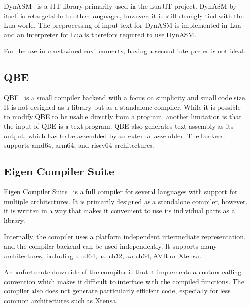 DynASM~\cite{dynasm} is a JIT library primarily used in the LuaJIT project. DynASM by itself is retargetable to other languages, however, it is still strongly tied with the Lua world. The preprocessing of input text for DynASM is implemented in Lua and an interpreter for Lua is therefore required to use DynASM.

For the use in constrained environments, having a second interpreter is not ideal.


\subsection{QBE}

QBE~\cite{qbe} is a small compiler backend with a focus on simplicity and small code size. It is not designed as a library but as a standalone compiler. While it is possible to modify QBE to be usable directly from a program, another limitation is that the input of QBE is a text program. QBE also generates text assembly as its output, which has to be assembled by an external assembler. The backend supports amd64, arm64, and riscv64 architectures.


\subsection{Eigen Compiler Suite}

Eigen Compiler Suite~\cite{ecs} is a full compiler for several languages with support for multiple architectures. It is primarily designed as a standalone compiler, however, it is written in a way that makes it convenient to use its individual parts as a library.

Internally, the compiler uses a platform independent intermediate representation, and the compiler backend can be used independently. It supports many architectures, including amd64, aarch32, aarch64, AVR or Xtensa.

An unfortunate downside of the compiler is that it implements a custom calling convention which makes it difficult to interface with the compiled functions. The compiler also does not generate particularly efficient code, especially for less common architectures such as Xtensa.
